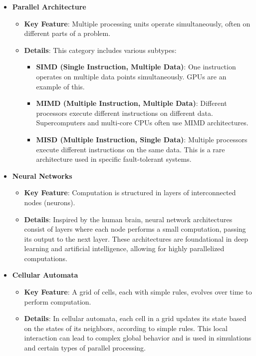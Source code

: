 \documentclass{article}
\begin{document}
\begin{itemize}
    \item{\textbf{Parallel Architecture}}
    \begin{itemize}
        \item{\textbf{Key Feature}}: Multiple processing units operate simultaneously, often on different parts of a problem.
        \item{\textbf{Details}}: This category includes various subtypes:
        \begin{itemize}
            \item{\textbf{SIMD (Single Instruction, Multiple Data)}}: One instruction operates on multiple data points simultaneously. GPUs are an example of this.
            \item{\textbf{MIMD (Multiple Instruction, Multiple Data)}}: Different processors execute different instructions on different data. Supercomputers and multi-core CPUs often use MIMD architectures.
            \item{\textbf{MISD (Multiple Instruction, Single Data)}}: Multiple processors execute different instructions on the same data. This is a rare architecture used in specific fault-tolerant systems.
        \end{itemize}
    \end{itemize}

    \item{\textbf{Neural Networks}}
    \begin{itemize}
        \item{\textbf{Key Feature}}: Computation is structured in layers of interconnected nodes (neurons).
        \item{\textbf{Details}}: Inspired by the human brain, neural network architectures consist of layers where each node performs a small computation, passing its output to the next layer. These architectures are foundational in deep learning and artificial intelligence, allowing for highly parallelized computations.
    \end{itemize}

    \item{\textbf{Cellular Automata}}
    \begin{itemize}
        \item{\textbf{Key Feature}}: A grid of cells, each with simple rules, evolves over time to perform computation.
        \item{\textbf{Details}}: In cellular automata, each cell in a grid updates its state based on the states of its neighbors, according to simple rules. This local interaction can lead to complex global behavior and is used in simulations and certain types of parallel processing.
    \end{itemize}


\end{itemize}
\end{document}
